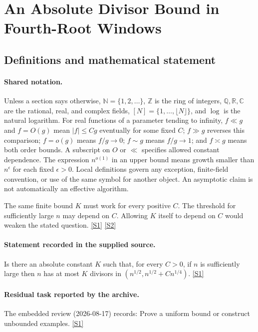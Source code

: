 \documentclass[11pt,a4paper]{article}
\newcommand{\N}{\mathbb{N}}
\newcommand{\Z}{\mathbb{Z}}
\newcommand{\Q}{\mathbb{Q}}
\newcommand{\R}{\mathbb{R}}
\newcommand{\C}{\mathbb{C}}
\newcommand{\sref}[2]{\hyperlink{source:#1:#2}{[S#2]}}
\begin{document}
\section{An Absolute Divisor Bound in Fourth-Root Windows}\label{statement}


\subsection{Definitions and mathematical statement}

\paragraph{Shared notation.}Unless a section says otherwise, $\N=\{1,2,\ldots\}$,
$\Z$ is the ring of integers, $\Q,\R,\C$ are the rational, real, and complex
fields, $[N]=\{1,\ldots,\lfloor N\rfloor\}$, and $\log$ is the natural
logarithm. For real functions of a parameter tending to infinity,
$f\ll g$ and $f=O(g)$ mean $|f|\leq Cg$ eventually for some fixed $C$;
$f\gg g$ reverses this comparison; $f=o(g)$ means $f/g\to0$;
$f\sim g$ means $f/g\to1$; and $f\asymp g$ means both order bounds.
A subscript on $O$ or $\ll$ specifies allowed constant dependence.
The expression $n^{o(1)}$ in an upper bound means growth smaller than
$n^\epsilon$ for each fixed $\epsilon>0$. Local definitions govern any
exception, finite-field convention, or use of the same symbol for another
object. An asymptotic claim is not automatically an effective algorithm.



The same finite bound $K$ must work for every positive $C$. The threshold for sufficiently large $n$ may depend on $C$. Allowing $K$ itself to depend on $C$ would weaken the stated question. \sref{statement}{1} \sref{statement}{2}

\paragraph{Statement recorded in the supplied source.}
Is there an absolute constant $K$ such that, for every $C>0$, if $n$ is sufficiently large then $n$ has at most $K$ divisors in $(n^{1/2},n^{1/2}+C n^{1/4})$. \sref{statement}{1}

\paragraph{Residual task reported by the archive.}

The embedded review (2026-08-17) records: Prove a uniform bound or construct unbounded examples. \sref{statement}{1}
\end{document}
